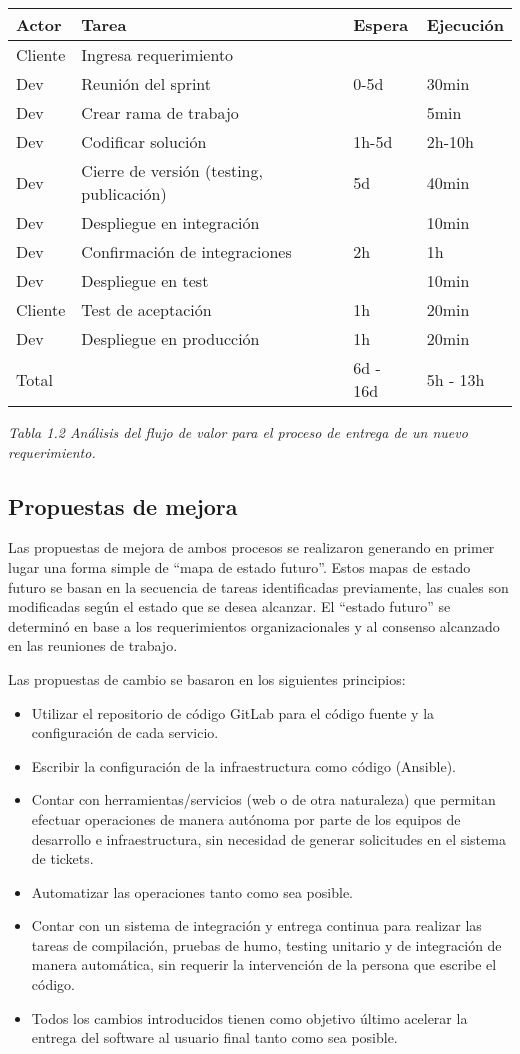 \begin{tabular}{|l|l|l|l|}
\hline
Actor & Tarea & Espera & Ejecución \\ \hline
Cliente & Ingresa requerimiento &  &  \\ \hline
Dev & Reunión del sprint & 0-5d & 30min \\ \hline
Dev & Crear rama de trabajo &  & 5min \\ \hline
Dev & Codificar solución & 1h-5d & 2h-10h \\ \hline
Dev & Cierre de versión (testing, publicación) & 5d & 40min \\ \hline
Dev & Despliegue en integración &  & 10min \\ \hline
Dev & Confirmación de integraciones & 2h & 1h \\ \hline
Dev & Despliegue en test &  & 10min \\ \hline
Cliente & Test de aceptación & 1h & 20min \\ \hline
Dev & Despliegue en producción & 1h & 20min \\ \hline
Total &  & 6d - 16d & 5h - 13h \\ \hline
\end{tabular}
\textit{Tabla 1.2 Análisis del flujo de valor para el proceso de entrega de un nuevo requerimiento.}

\subsection{Propuestas de mejora}

Las propuestas de mejora de ambos procesos se realizaron generando en primer lugar una forma simple de “mapa de estado futuro”. Estos mapas de estado futuro se basan en la secuencia de tareas identificadas previamente, las cuales son  modificadas según el estado que se desea alcanzar. El “estado futuro” se determinó en base a los requerimientos organizacionales y al consenso alcanzado en las reuniones de trabajo.

Las propuestas de cambio se basaron en los siguientes principios:

\begin{itemize}
\item Utilizar el repositorio de código GitLab para el código fuente y la configuración de cada servicio.
\item Escribir la configuración de la infraestructura como código (Ansible).
\item Contar con herramientas/servicios (web o de otra naturaleza) que permitan efectuar operaciones de manera autónoma por parte de los equipos de desarrollo e infraestructura, sin necesidad de generar solicitudes en el sistema de tickets.
\item Automatizar las operaciones tanto como sea posible.
\item Contar con un sistema de integración y entrega continua para realizar las tareas de compilación, pruebas de humo, testing unitario y de integración de manera automática, sin requerir la intervención de la persona que escribe el código.
\item Todos los cambios introducidos tienen como objetivo último acelerar la entrega del software al usuario final tanto como sea posible.
\end{itemize}
